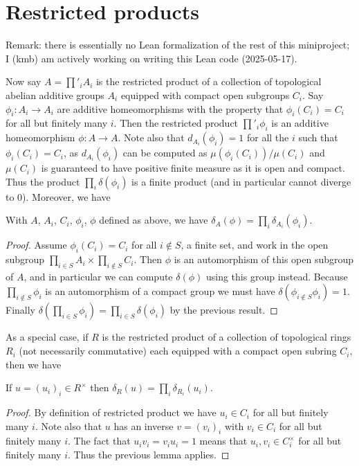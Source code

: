 \section{Restricted products}

Remark: there is essentially no Lean formalization of the rest of this miniproject;
I (kmb) am actively working on writing this Lean code (2025-05-17).

Now say $A=\prod'_i A_i$ is the restricted product of a collection of topological abelian additive groups $A_i$
  equipped with compact open subgroups $C_i$. Say $\phi_i:A_i\to A_i$ are additive homeomorphisms
  with the property that $\phi_i(C_i)=C_i$ for all but finitely many $i$. Then the restricted
  product $\prod'_i\phi_i$ is an additive homeomorphism $\phi:A\to A$. Note also that
  $d_{A_i}(\phi_i)=1$ for all the $i$ such that $\phi_i(C_i)=C_i$, as $d_{A_i}(\phi_i)$ can be
  computed as $\mu(\phi_i(C_i))/\mu(C_i)$ and $\mu(C_i)$ is guaranteed to have positive finite measure
  as it is open and compact. Thus the product $\prod_i\delta(\phi_i)$ is a finite product (and in
  particular cannot diverge to $0$). Moreover, we have

\begin{lemma}
  \label{addHaarScalarFactor_restricted_product}
  With $A$, $A_i$, $C_i$, $\phi_i$, $\phi$ defined as above, we have
  $\delta_A(\phi)=\prod_i\delta_{A_i}(\phi_i)$.
\end{lemma}
\begin{proof}
  Assume $\phi_i(C_i)=C_i$ for all $i\not\in S$, a finite set, and work in the
  open subgroup $\prod_{i\in S}A_i\times\prod_{i\not\in S}C_i$. Then $\phi$ is an automorphism of
  this open subgroup of $A$, and in particular we can compute $\delta(\phi)$ using
  this group instead. Because $\prod_{i\not\in S}\phi_i$ is an automorphism of a compact
  group we must have $\delta(\phi_{i\not\in S}\phi_i)=1$. Finally
  $\delta(\prod_{i\in S}\phi_i)=\prod_{i\in S}\delta(\phi_i)$ by the previous result.
\end{proof}

As a special case, if $R$ is the restricted product of a collection of topological rings $R_i$
  (not necessarily commutative) each equipped with a compact open subring $C_i$, then
  we have

\begin{corollary}
  \label{distribHaarChar_restricted_product}
  If $u=(u_i)_i\in R^\times$ then $\delta_R(u)=\prod_i\delta_{R_i}(u_i)$.
\end{corollary}
\begin{proof}
  By definition of restricted product we have $u_i\in C_i$ for all but finitely many $i$.
  Note also that $u$ has an inverse $v=(v_i)_i$ with $v_i\in C_i$ for all but finitely many $i$.
  The fact that $u_iv_i=v_iu_i=1$ means that $u_i,v_i\in C_i^\times$ for all but finitely many $i$.
  Thus the previous lemma applies.
\end{proof}

